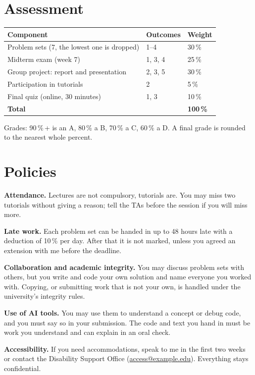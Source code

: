 \documentclass[11pt,a4paper]{article}
\begin{document}
\section{Assessment}
\begin{tabularx}{\textwidth}{@{}Lp{2.2cm}C{1.6cm}@{}}
  \toprule
  \textbf{Component} & \textbf{Outcomes} & \textbf{Weight} \\
  \midrule
  Problem sets (7, the lowest one is dropped) & 1--4 & 30\,\% \\
  Midterm exam (week 7) & 1, 3, 4 & 25\,\% \\
  Group project: report and presentation & 2, 3, 5 & 30\,\% \\
  Participation in tutorials & 2 & 5\,\% \\
  Final quiz (online, 30 minutes) & 1, 3 & 10\,\% \\
  \midrule
  \textbf{Total} & & \textbf{100\,\%} \\
  \bottomrule
\end{tabularx}

\smallskip
Grades: 90\,\%\,+ is an A, 80\,\% a B, 70\,\% a C, 60\,\% a D. A final grade is
rounded to the nearest whole percent.

\section{Policies}
\textbf{Attendance.} Lectures are not compulsory, tutorials are. You may miss two tutorials
without giving a reason; tell the TAs before the session if you will miss more.

\textbf{Late work.} Each problem set can be handed in up to 48 hours late with a deduction of
10\,\% per day. After that it is not marked, unless you agreed an extension with me before the deadline.

\textbf{Collaboration and academic integrity.} You may discuss problem sets with others, but
you write and code your own solution and name everyone you worked with. Copying, or
submitting work that is not your own, is handled under the university's integrity rules.

\textbf{Use of AI tools.} You may use them to understand a concept or debug code, and you
must say so in your submission. The code and text you hand in must be work you understand
and can explain in an oral check.

\textbf{Accessibility.} If you need accommodations, speak to me in the first two weeks or
contact the Disability Support Office (\href{mailto:access@example.edu}{access@example.edu}).
Everything stays confidential.
\end{document}
